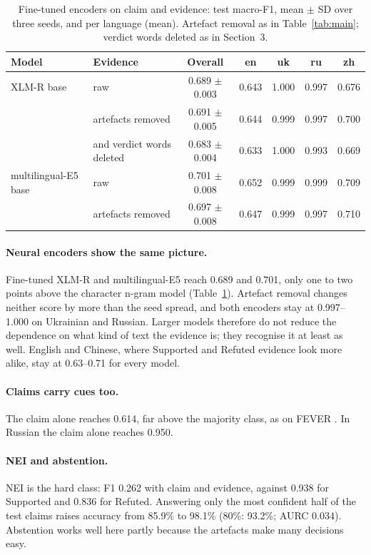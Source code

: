 \documentclass[11pt,a4paper]{article}
\begin{document}
\begin{table}[t]
\centering\small
\caption{Fine-tuned encoders on claim and evidence: test macro-F1, mean $\pm$ SD over three seeds, and per language
(mean). Artefact removal as in Table~\ref{tab:main}; verdict words deleted as in Section~3.}
\label{tab:neural}
\setlength{\tabcolsep}{4pt}
\begin{tabular}{llccccc}
\toprule
Model & Evidence & Overall & en & uk & ru & zh \\
\midrule
XLM-R base & raw & 0.689 $\pm$ 0.003 & 0.643 & 1.000 & 0.997 & 0.676 \\
 & artefacts removed & 0.691 $\pm$ 0.005 & 0.644 & 0.999 & 0.997 & 0.700 \\
 & \quad and verdict words deleted & 0.683 $\pm$ 0.004 & 0.633 & 1.000 & 0.993 & 0.669 \\
multilingual-E5 base & raw & 0.701 $\pm$ 0.008 & 0.652 & 0.999 & 0.999 & 0.709 \\
 & artefacts removed & 0.697 $\pm$ 0.008 & 0.647 & 0.999 & 0.997 & 0.710 \\
\bottomrule
\end{tabular}
\end{table}

\paragraph{Neural encoders show the same picture.} Fine-tuned XLM-R and multilingual-E5 reach 0.689 and 0.701,
only one to two points above the character n-gram model (Table~\ref{tab:neural}). Artefact removal changes neither
score by more than the seed spread, and both encoders stay at 0.997--1.000 on Ukrainian and Russian. Larger models
therefore do not reduce the dependence on what kind of text the evidence is; they recognise it at least as well.
English and Chinese, where Supported and Refuted evidence look more alike, stay at 0.63--0.71 for every model.

\paragraph{Claims carry cues too.} The claim alone reaches 0.614, far above the majority class, as on FEVER
\citep{schuster2019debiasing}. In Russian the claim alone reaches 0.950.

\paragraph{NEI and abstention.} NEI is the hard class: F1 0.262 with claim and evidence, against 0.938 for Supported
and 0.836 for Refuted. Answering only the most confident half of the test claims raises accuracy from 85.9\% to
98.1\% (80\%: 93.2\%; AURC 0.034). Abstention works well here partly because the artefacts make many decisions easy.
\end{document}
